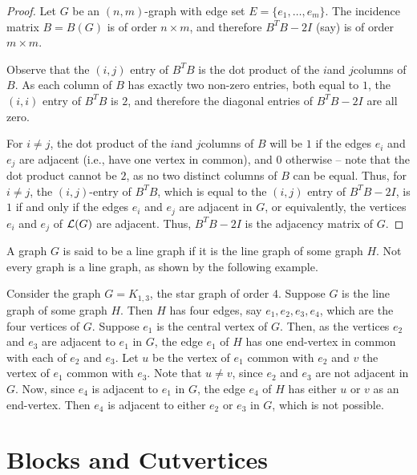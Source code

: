 \begin{proof}
	Let $G$ be an $(n, m)$-graph with edge set $E = \{e_1, \ldots, e_m\}$. The incidence matrix $B = B(G)$ is of order $n \times m$, and therefore $B^T B - 2I$ (say) is of order $m \times m$.
	
	Observe that the $(i, j)$ entry of $B^T B$ is the dot product of the $i$\nth and $j$\nth columns of $B$. As each column of $B$ has exactly two non-zero entries, both equal to $1$, the $(i, i)$ entry of $B^T B$ is $2$, and therefore the diagonal entries of $B^T B - 2I$ are all zero.
	
	For $i \ne j$, the dot product of the $i$\nth and $j$\nth columns of $B$ will be $1$ if the edges $e_i$ and $e_j$ are adjacent (i.e., have one vertex in common), and $0$ otherwise -- note that the dot product cannot be $2$, as no two distinct columns of $B$ can be equal. Thus, for $i \ne j$, the $(i, j)$-entry of $B^T B$, which is equal to the $(i, j)$ entry of $B^T B - 2I$, is $1$ if and only if the edges $e_i$ and $e_j$ are adjacent in $G$, or equivalently, the vertices $e_i$ and $e_j$ of $\operatorname{\mathcal L}(G)$ are adjacent. Thus, $B^T B - 2I$ is the adjacency matrix of $G$.
\end{proof}

A graph $G$ is said to be a line graph if it is the line graph of some graph $H$. Not every graph is a line graph, as shown by the following example.

\begin{Example}
Consider the graph $G = K_{1, 3}$, the star graph of order $4$. Suppose $G$ is the line graph of some graph $H$. Then $H$ has four edges, say $e_1, e_2, e_3, e_4$, which are the four vertices of $G$. Suppose $e_1$ is the central vertex of $G$. Then, as the vertices $e_2$ and $e_3$ are adjacent to $e_1$ in $G$, the edge $e_1$ of $H$ has one end-vertex in common with each of $e_2$ and $e_3$. Let $u$ be the vertex of $e_1$ common with $e_2$ and $v$ the vertex of $e_1$ common with $e_3$. Note that $u \ne v$, since $e_2$ and $e_3$ are not adjacent in $G$. Now, since $e_4$ is adjacent to $e_1$ in $G$, the edge $e_4$ of $H$ has either $u$ or $v$ as an end-vertex. Then $e_4$ is adjacent to either $e_2$ or $e_3$ in $G$, which is not possible.
\end{Example}


\section{Blocks and Cutvertices}\label{sec:Blocks}

